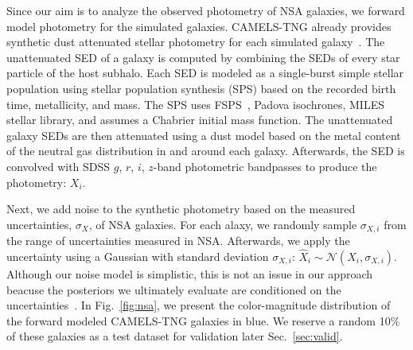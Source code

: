 Since our aim is to analyze the observed photometry of NSA galaxies, we forward
model photometry for the simulated galaxies. 
CAMELS-TNG already provides synthetic dust attenuated stellar photometry for
each simulated galaxy~\citep{nelson2018}.
The unattenuated SED of a galaxy is computed by combining the SEDs of every
star particle of the host subhalo. 
Each SED is modeled as a single-burst simple stellar population using stellar
population synthesis (SPS) based on the recorded birth time, metallicity, and
mass. 
The SPS uses FSPS~\citep{conroy2009, conroy2010}, Padova isochrones, MILES
stellar library, and assumes a Chabrier initial mass function. 
The unattenuated galaxy SEDs are then attenuated using a dust model based on
the metal content of the neutral gas distribution in and around each
galaxy.
Afterwards, the SED is convolved with SDSS $g$, $r$, $i$, $z$-band photometric
bandpasses to produce the photometry: $X_i$. 

Next, we add noise to the synthetic photometry based on the measured
uncertainties, $\sigma_X$, of NSA galaxies. 
For each alaxy, we randomly sample $\sigma_{X,i}$ from the range of
uncertainties measured in NSA. 
Afterwards, we apply the uncertainty using a Gaussian with standard deviation
$\sigma_{X,i}$: $\hat{X}_i \sim \mathcal{N}(X_i, \sigma_{X, i})$. 
Although our noise model is simplistic, this is not an issue in our
approach beacuse the posteriors we ultimately evaluate are conditioned on the
uncertainties~\citep{hahn2022a}. 
In Fig.~\ref{fig:nsa}, we present the color-magnitude distribution of the
forward modeled CAMELS-TNG galaxies in blue. 
We reserve a random 10\% of these galaxies as a test dataset for validation
later Sec.~\ref{sec:valid}.
